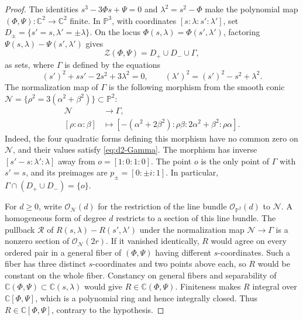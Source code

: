 \documentclass[11pt,letterpaper]{article}
\numberwithin{equation}{section}
\theoremstyle{remark}
\theoremstyle{plain}
\newcommand{\C}{\mathbb{C}}
\begin{document}
\begin{proof}
The identities $s^3-3\Phi s+\Psi=0$ and
$\lambda^2=s^2-\Phi$ make the polynomial map
$(\Phi,\Psi):\C^2\to\C^2$ finite.
In $\mathbb P^3$, with coordinates $[s:\lambda:s':\lambda']$, set
$D_\pm=\{s'=s,\lambda'=\pm\lambda\}$.  On the locus
$\Phi(s,\lambda)=\Phi(s',\lambda')$, factoring
$\Psi(s,\lambda)-\Psi(s',\lambda')$ gives
\[
 \mathcal Z(\Phi,\Psi)=D_+\cup D_-\cup\Gamma,
\]
as sets, where $\Gamma$ is defined by the equations
\begin{equation}
 (s')^2+ss'-2s^2+3\lambda^2=0,\qquad
 (\lambda')^2=(s')^2-s^2+\lambda^2.                 \label{eq:d2-Gamma}
\end{equation}
The normalization map of $\Gamma$ is the following morphism from the
smooth conic
$\mathcal N=\{\rho^2=3(\alpha^2+\beta^2)\}\subset\mathbb P^2$:
\[
 \begin{aligned}
 \mathcal N&\longrightarrow\Gamma,\\
 [\rho:\alpha:\beta]&\longmapsto
 [-(\alpha^2+2\beta^2):\rho\beta:
   2\alpha^2+\beta^2:\rho\alpha].
 \end{aligned}
\]
Indeed, the four quadratic forms defining this morphism have no common
zero on $\mathcal N$, and their values satisfy \eqref{eq:d2-Gamma}.
The morphism has inverse $[s'-s:\lambda':\lambda]$ away from
$o=[1:0:1:0]$.  The point $o$ is the only point of $\Gamma$ with
$s'=s$, and its preimages are $p_\pm=[0:\pm i:1]$.
In particular, $\Gamma\cap(D_+\cup D_-)=\{o\}$.

For $d\geq0$, write $\mathcal O_{\mathcal N}(d)$ for the restriction
of the line bundle $\mathcal O_{\mathbb P^2}(d)$ to $\mathcal N$.
A homogeneous form of degree $d$ restricts to a section of this line
bundle.
The pullback $\mathcal R$ of $R(s,\lambda)-R(s',\lambda')$ under the
normalization map $\mathcal N\to\Gamma$ is a nonzero section of
$\mathcal O_{\mathcal N}(2r)$.
If it vanished identically, $R$ would agree on every ordered pair in
a general fiber of $(\Phi,\Psi)$ having different $s$-coordinates.  Such a fiber has
three distinct $s$-coordinates and two points above each, so $R$ would be
constant on the whole fiber.  Constancy on general fibers and
separability of $\C(\Phi,\Psi)\subset\C(s,\lambda)$ would give
$R\in\C(\Phi,\Psi)$.  Finiteness makes $R$ integral over
$\C[\Phi,\Psi]$, which is a polynomial ring and hence integrally
closed.  Thus $R\in\C[\Phi,\Psi]$, contrary to the hypothesis.


\end{proof}
\end{document}
